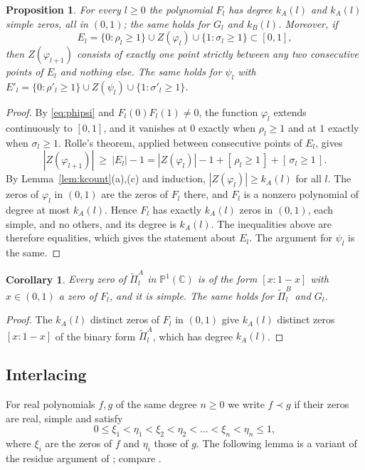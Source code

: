 \documentclass[11pt]{amsart}
\newtheorem{proposition}[theorem]{Proposition}
\newtheorem{corollary}[theorem]{Corollary}
\theoremstyle{definition}
\theoremstyle{remark}
\numberwithin{equation}{section}
\newcommand{\C}{\mathbb{C}}
\newcommand{\ind}[1]{[\,#1\,]}
\begin{document}
\begin{proposition}\label{prop:rolle}
For every $l\ge0$ the polynomial $F_l$ has degree $k_A(l)$ and $k_A(l)$ simple zeros, all in $(0,1)$; the same holds for $G_l$ and $k_B(l)$. Moreover, if
\[
E_l=\{0:\rho_l\ge1\}\cup Z(\varphi_l)\cup\{1:\sigma_l\ge1\}\subset[0,1],
\]
then $Z(\varphi_{l+1})$ consists of exactly one point strictly between any two consecutive points of $E_l$ and nothing else. The same holds for $\psi_l$ with $E'_l=\{0:\rho'_l\ge1\}\cup Z(\psi_l)\cup\{1:\sigma'_l\ge1\}$.
\end{proposition}

\begin{proof}
By \eqref{eq:phipsi} and $F_l(0)F_l(1)\neq0$, the function $\varphi_l$ extends continuously to $[0,1]$, and it vanishes at $0$ exactly when $\rho_l\ge1$ and at $1$ exactly when $\sigma_l\ge1$. Rolle's theorem, applied between consecutive points of $E_l$, gives
\[
|Z(\varphi_{l+1})|\ \ge\ |E_l|-1=|Z(\varphi_l)|-1+\ind{\rho_l\ge1}+\ind{\sigma_l\ge1}.
\]
By Lemma~\ref{lem:kcount}(a),(c) and induction, $|Z(\varphi_l)|\ge k_A(l)$ for all $l$. The zeros of $\varphi_l$ in $(0,1)$ are the zeros of $F_l$ there, and $F_l$ is a nonzero polynomial of degree at most $k_A(l)$. Hence $F_l$ has exactly $k_A(l)$ zeros in $(0,1)$, each simple, and no others, and its degree is $k_A(l)$. The inequalities above are therefore equalities, which gives the statement about $E_l$. The argument for $\psi_l$ is the same.
\end{proof}

\begin{corollary}\label{cor:forms}
Every zero of $\tilde\Pi^A_l$ in $\mathbb P^1(\C)$ is of the form $[x:1-x]$ with $x\in(0,1)$ a zero of $F_l$, and it is simple. The same holds for $\tilde\Pi^B_l$ and $G_l$.
\end{corollary}

\begin{proof}
The $k_A(l)$ distinct zeros of $F_l$ in $(0,1)$ give $k_A(l)$ distinct zeros $[x:1-x]$ of the binary form $\tilde\Pi^A_l$, which has degree $k_A(l)$.
\end{proof}

\subsection{Interlacing}
For real polynomials $f,g$ of the same degree $n\ge0$ we write $f\prec g$ if their zeros are real, simple and satisfy
\[
0\le\xi_1<\eta_1<\xi_2<\eta_2<\dots<\xi_n<\eta_n\le1,
\]
where $\xi_i$ are the zeros of $f$ and $\eta_i$ those of $g$. The following lemma is a variant of the residue argument of \cite[Lemma~3.4]{Pud26}; compare \cite[Section~1.3]{Fisk}.
\end{document}
